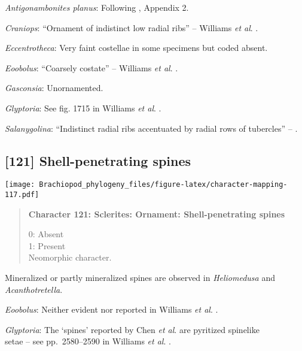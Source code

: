 \documentclass[openany]{book}
\theoremstyle{definition}
\theoremstyle{definition}
\theoremstyle{definition}
\theoremstyle{remark}
\begin{document}
\hypertarget{Antigonambonites_planus-coding-120}{}
\emph{Antigonambonites planus}: Following
\citet{Williams1998Thediversity}, Appendix 2.

\hypertarget{Craniops-coding-120}{}
\emph{Craniops}: ``Ornament of indistinct low radial ribs'' -- Williams
\emph{et al}. \citeyearpar[p167]{Williams2000LinguliformeaCraniiformea}.

\hypertarget{Eccentrotheca-coding-120}{}
\emph{Eccentrotheca}: Very faint costellae in some specimens but coded
absent.

\hypertarget{Eoobolus-coding-120}{}
\emph{Eoobolus}: ``Coarsely costate'' -- Williams \emph{et al}.
\citeyearpar[p710]{Williams2000LinguliformeaCraniiformea}.

\hypertarget{Gasconsia-coding-120}{}
\emph{Gasconsia}: Unornamented.

\hypertarget{Glyptoria-coding-120}{}
\emph{Glyptoria}: See fig. 1715 in Williams \emph{et al}.
\citeyearpar{Williams2007Supplement}.

\hypertarget{Salanygolina-coding-120}{}
\emph{Salanygolina}: ``Indistinct radial ribs accentuated by radial rows
of tubercles'' -- \citet{Popov2009Earlyontogeny}.

\subsection*{{[}121{]} Shell-penetrating
spines}\label{shell-penetrating-spines}

\texttt{[image: Brachiopod\_phylogeny\_files/figure-latex/character-mapping-117.pdf]}

\begin{quote}
\textbf{Character 121: Sclerites: Ornament: Shell-penetrating spines}

0: Absent\\
1: Present\\
Neomorphic character.
\end{quote}

Mineralized or partly mineralized spines are observed in
\emph{Heliomedusa} and \emph{Acanthotretella}.

\hypertarget{Eoobolus-coding-121}{}
\emph{Eoobolus}: Neither evident nor reported in Williams \emph{et al}.
\citeyearpar{Williams2000LinguliformeaCraniiformea}.

\hypertarget{Glyptoria-coding-121}{}
\emph{Glyptoria}: The `spines' reported by Chen \emph{et al}.
\citeyearpar{Chen2007Reinterpretationof} are pyritized spinelike\\
setae -- see pp.~2580--2590 in Williams \emph{et al}.
\citeyearpar{Williams2007Supplement}.
\end{document}
